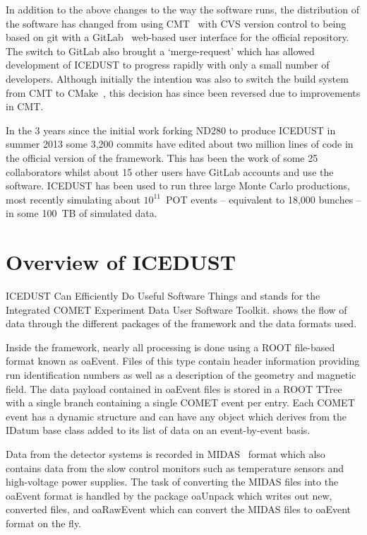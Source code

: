 In addition to the above changes to the way the software runs, the distribution of the software has changed from using CMT~\cite{cmt} with CVS version control to being based on git with a GitLab~\cite{GitLab} web-based user interface for the official repository.
The switch to GitLab also brought a `merge-request' which has allowed development of ICEDUST to progress rapidly with only a small number of developers.
Although initially the intention was also to switch the build system from CMT to CMake~\cite{cmake}, this decision has since been reversed due to improvements in CMT.

In the 3 years since the initial work forking ND280 to produce ICEDUST in summer 2013 some 3,200 commits have edited about two million lines of code in the official version of the framework.
This has been the work of some 25 collaborators whilst about 15 other users have GitLab accounts and use the software.
ICEDUST has been used to run three large Monte Carlo productions, most recently simulating about $10^{11}$~\ac{POT} events -- equivalent to 18,000 \phaseI bunches -- in some 100~TB of simulated data.

\section{Overview of ICEDUST}
ICEDUST Can Efficiently Do Useful Software Things and stands for the Integrated COMET Experiment Data User Software Toolkit.
 shows the flow of data through the different packages of the framework and the data formats used.

\FigICEDUSTOverview

Inside the framework, nearly all processing is done using a ROOT file-based format known as oaEvent.  
Files of this type contain header information providing run identification numbers as well as a description of the geometry and magnetic field.  
The data payload contained in oaEvent files is stored in a ROOT TTree with a single branch containing a single COMET event per entry.
Each COMET event has a dynamic structure and can have any object which derives from the IDatum base class added to its list of data on an event-by-event basis.

Data from the detector systems is recorded in MIDAS~\cite{MIDAS} format which also contains data from the slow control monitors such as temperature sensors and high-voltage power supplies.
The task of converting the MIDAS files into the oaEvent format is handled by the package oaUnpack which writes out new, converted files, and oaRawEvent which can convert the MIDAS files to oaEvent format on the fly.

